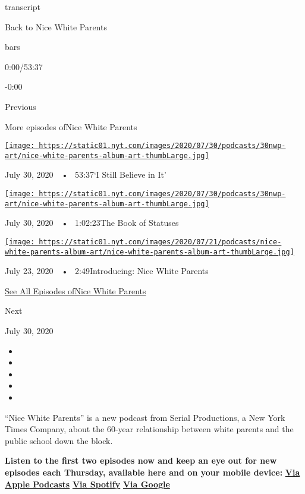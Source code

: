 transcript

Back to Nice White Parents

bars

0:00/53:37

-0:00

Previous

More episodes ofNice White Parents

\href{https://www.nytimes.com/2020/07/30/podcasts/nice-white-parents-serial-2.html?action=click\&module=audio-series-bar\&region=header\&pgtype=Article}{\texttt{[image: https://static01.nyt.com/images/2020/07/30/podcasts/30nwp-art/nice-white-parents-album-art-thumbLarge.jpg]}}

July 30, 2020~~•~ 53:37`I Still Believe in It'

\href{https://www.nytimes.com/2020/07/30/podcasts/nice-white-parents-serial.html?action=click\&module=audio-series-bar\&region=header\&pgtype=Article}{\texttt{[image: https://static01.nyt.com/images/2020/07/30/podcasts/30nwp-art/nice-white-parents-album-art-thumbLarge.jpg]}}

July 30, 2020~~•~ 1:02:23The Book of Statuses

\href{https://www.nytimes.com/2020/07/23/podcasts/nice-white-parents-serial.html?action=click\&module=audio-series-bar\&region=header\&pgtype=Article}{\texttt{[image: https://static01.nyt.com/images/2020/07/21/podcasts/nice-white-parents-album-art/nice-white-parents-album-art-thumbLarge.jpg]}}

July 23, 2020~~•~ 2:49Introducing: Nice White Parents

\href{https://www.nytimes.com/column/nice-white-parents}{See All
Episodes ofNice White Parents}

Next

July 30, 2020

\begin{itemize}
\item
\item
\item
\item
\item
\end{itemize}

``Nice White Parents'' is a new podcast from Serial Productions, a New
York Times Company, about the 60-year relationship between white parents
and the public school down the block.

\textbf{Listen to the first two episodes now and keep an eye out for new
episodes each Thursday, available here and on your mobile device:}
\textbf{\href{https://podcasts.apple.com/us/podcast/nice-white-parents/id1524080195}{Via
Apple Podcasts}} \textbf{\textbar{}}
\textbf{\href{https://open.spotify.com/show/7oBSLCZFCgpdCaBjIG8mLV?si=YcEPLD3xT2ejXmpQz-tRpw}{Via
Spotify}} \textbf{\textbar{}}
\textbf{\href{https://podcasts.google.com/feed/aHR0cHM6Ly9yc3MuYXJ0MTkuY29tL25pY2Utd2hpdGUtcGFyZW50cw}{Via
Google}}

